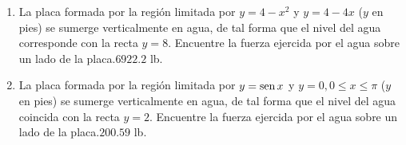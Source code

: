 {\begin{enumerate}
\item {La placa formada por la región limitada por $y=4-x^{2}$ y $y=4-4x$ ($%
y$ en pies) se sumerge verticalmente en agua, de tal forma que el nivel del
agua corresponde con la recta $y=8$. Encuentre la fuerza ejercida por el
agua sobre un lado de la placa.}{$6922.2$ lb.}



\item {\label{masafin}La placa formada por la región limitada por $y=\text{\rm sen}\, x$ y $y=0,0\leq
x\leq \pi $ ($y$ en pies) se sumerge verticalmente en agua, de tal forma
que el nivel del agua coincida con la recta $y=2$. Encuentre la fuerza
ejercida por el agua sobre un lado de la placa.}{$200.59$ lb.}
\end{enumerate}
}

